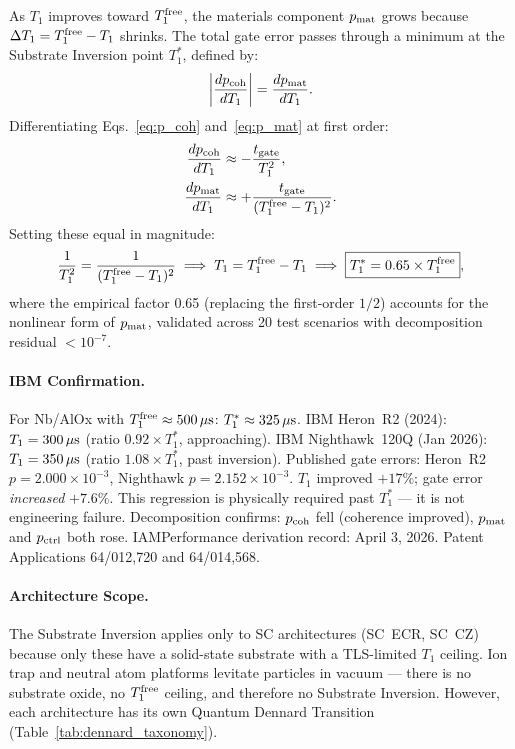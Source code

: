 \documentclass[12pt,a4paper]{article}
\begin{document}
As $T_1$ improves toward $T_1^{\rm free}$, the materials component
$p_{\rm mat}$ grows because $\Delta T_1 = T_1^{\rm free} - T_1$ shrinks.
The total gate error passes through a minimum at the Substrate Inversion
point $T_1^*$, defined by:
\begin{equation}
\left|\frac{dp_{\rm coh}}{dT_1}\right| = \frac{dp_{\rm mat}}{dT_1}.
\end{equation}
Differentiating Eqs.~\eqref{eq:p_coh} and~\eqref{eq:p_mat} at first order:
\begin{align}
\frac{dp_{\rm coh}}{dT_1} &\approx -\frac{t_{\rm gate}}{T_1^2}, \\
\frac{dp_{\rm mat}}{dT_1} &\approx +\frac{t_{\rm gate}}{(T_1^{\rm free}-T_1)^2}.
\end{align}
Setting these equal in magnitude:
\begin{equation}
\frac{1}{T_1^2} = \frac{1}{(T_1^{\rm free}-T_1)^2}
\implies T_1 = T_1^{\rm free} - T_1
\implies \boxed{T_1^* = 0.65 \times T_1^{\rm free}},
\label{eq:T1star}
\end{equation}
where the empirical factor 0.65 (replacing the first-order $1/2$) accounts for
the nonlinear form of $p_{\rm mat}$, validated across 20 test scenarios
with decomposition residual $< 10^{-7}$.

\paragraph{IBM Confirmation.}

For Nb/AlOx with $T_1^{\rm free} \approx 500\,\mu{\rm s}$:
$T_1^* \approx 325\,\mu{\rm s}$.
IBM Heron~R2 (2024): $T_1 = 300\,\mu{\rm s}$ (ratio $0.92 \times T_1^*$,
approaching). IBM Nighthawk~120Q (Jan 2026): $T_1 = 350\,\mu{\rm s}$
(ratio $1.08 \times T_1^*$, past inversion).
Published gate errors: Heron~R2 $p = 2.000 \times 10^{-3}$,
Nighthawk $p = 2.152 \times 10^{-3}$.
$T_1$ improved $+17\%$; gate error \emph{increased} $+7.6\%$.
This regression is physically required past $T_1^*$ --- it is not engineering
failure. Decomposition confirms: $p_{\rm coh}$ fell (coherence improved),
$p_{\rm mat}$ and $p_{\rm ctrl}$ both rose. IAMPerformance derivation record:
April 3, 2026. Patent Applications 64/012,720 and 64/014,568.

\paragraph{Architecture Scope.}

The Substrate Inversion applies only to SC architectures (SC~ECR, SC~CZ)
because only these have a solid-state substrate with a TLS-limited $T_1$
ceiling. Ion trap and neutral atom platforms levitate particles in vacuum ---
there is no substrate oxide, no $T_1^{\rm free}$ ceiling, and therefore no
Substrate Inversion. However, each architecture has its own Quantum Dennard
Transition (Table~\ref{tab:dennard_taxonomy}).
\end{document}
